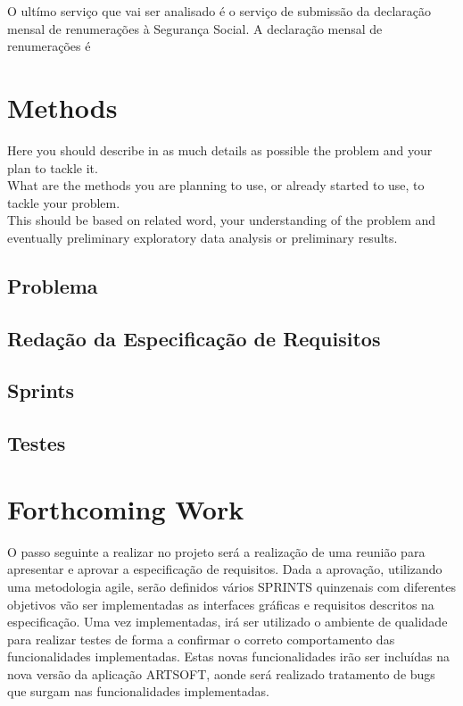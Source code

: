 \documentclass[sigplan]{acmart}
\begin{document}
O ultímo serviço que vai ser analisado é o serviço de submissão da declaração mensal de renumerações à Segurança Social. A declaração mensal de renumerações é 

\section{Methods} \label{sec:methods}

Here you should describe in as much details as possible the problem and your plan to tackle it. \\

What are the methods you are planning to use, or already started to use, to tackle your problem. \\

This should be based on related word, your understanding of the problem and eventually preliminary exploratory data analysis or preliminary results.

\subsection{Problema} %

\subsection{Redação da Especificação de Requisitos}

\subsection{Sprints}

\subsection{Testes}

\section{Forthcoming Work} \label{sec:forthcomingwork}

O passo seguinte a realizar no projeto será a realização de uma reunião para apresentar e aprovar a especificação de requisitos. Dada a aprovação, utilizando uma metodologia agile, serão definidos vários SPRINTS quinzenais com diferentes objetivos vão ser implementadas as interfaces gráficas e requisitos descritos na especificação. Uma vez implementadas, irá ser utilizado o ambiente de qualidade para realizar testes de forma a confirmar o correto comportamento das funcionalidades implementadas. Estas novas funcionalidades irão ser incluídas na nova versão da aplicação ARTSOFT, aonde será realizado tratamento de bugs que surgam nas funcionalidades implementadas.



\end{document}
